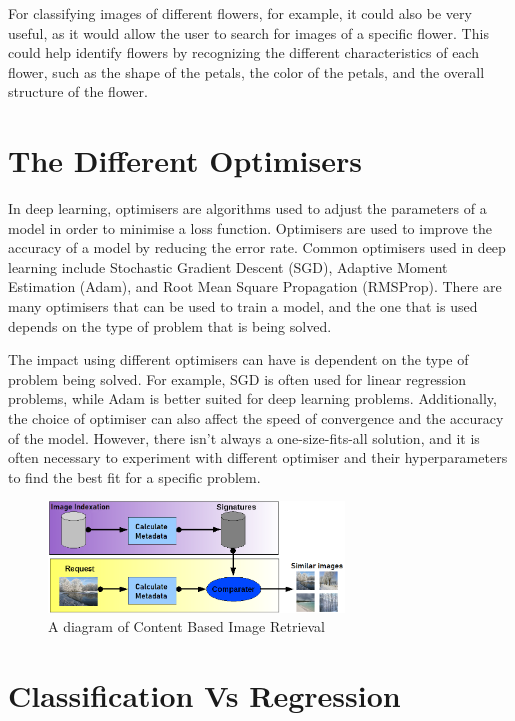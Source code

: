 \documentclass[]{final_report}
\begin{document}
For classifying images of different flowers, for example, it could also be very useful, as it would allow the user to search for images of a specific flower.
This could help identify flowers by recognizing the different characteristics of each flower, such as the shape of the petals,
the color of the petals, and the overall structure of the flower.

\section{The Different Optimisers}

In deep learning, optimisers are algorithms used to adjust the parameters of a model in order to minimise a loss function. Optimisers are used to improve the accuracy of a model by reducing the error rate. Common optimisers used in deep learning include Stochastic Gradient Descent (SGD), Adaptive Moment Estimation (Adam), and Root Mean Square Propagation (RMSProp). There are many optimisers that can be used to train a model, and the one that is used depends on the type of problem that is being solved.

The impact using different optimisers can have is dependent on the type of problem being solved. For example, SGD is often used for linear regression problems, while Adam is better suited for deep learning problems. Additionally, the choice of optimiser can also affect the speed of convergence and the accuracy of the model. However, there isn't always a one-size-fits-all solution, and it is often necessary to experiment with different optimiser and their hyperparameters to find the best fit for a specific problem.

\begin{figure}[h]
  \centering
  \includegraphics[width=0.7\textwidth]{images/Principe_cbir.png}
  \caption{A diagram of Content Based Image Retrieval \cite{ContentBasedImageRetrieval}}
\end{figure}

\section{Classification Vs Regression}
\end{document}
